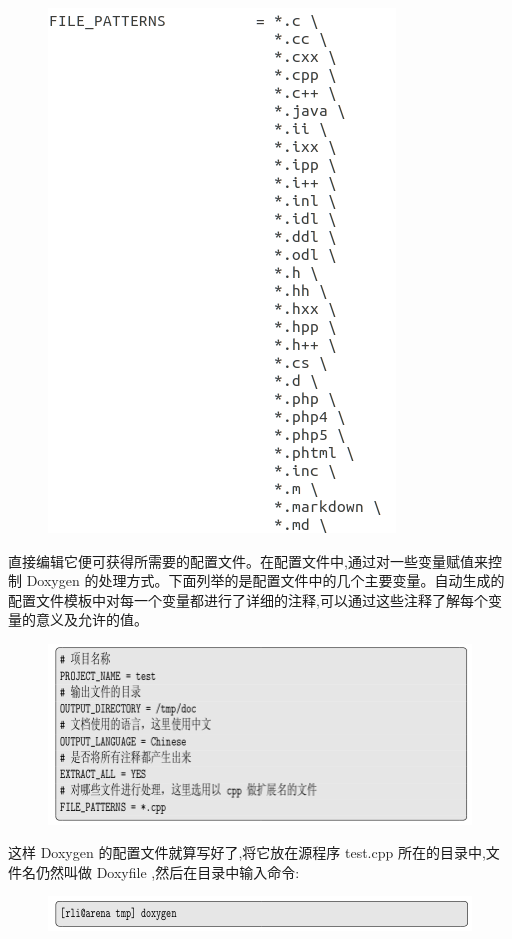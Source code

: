 \documentclass[12pt,a4paper]{article}
\begin{document}
\begin{figure}[H]
\centering
\includegraphics[scale=0.5]{./figures/37.png}
\caption{}
\end{figure}
直接编辑它便可获得所需要的配置文件。在配置文件中,通过对一些变量赋值来控制 Doxygen 的处理方式。下面列举的是配置文件中的几个主要变量。自动生成的配置文件模板中对每一个变量都进行了详细的注释,可以通过这些注释了解每个变量的意义及允许的值。
\begin{figure}[H]
\centering
\includegraphics[scale=0.5]{./figures/19.png}
\caption{}
\end{figure}
这样 Doxygen 的配置文件就算写好了,将它放在源程序 test.cpp 所在的目录中,文件名仍然叫做 Doxyfile ,然后在目录中输入命令:
\begin{figure}[H]
\centering
\includegraphics[scale=0.5]{./figures/20.png}
\caption{}
\end{figure}
\end{document}

